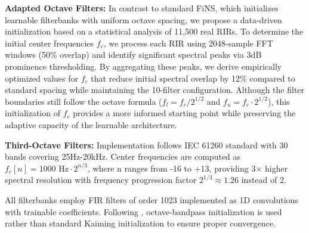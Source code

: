 \documentclass[conference]{IEEEtran}
\begin{document}
\textbf{Adapted Octave Filters:} In contrast to standard FiNS, which initializes learnable filterbanks with uniform octave spacing, we propose a data-driven initialization based on a statistical analysis of 11,500 real RIRs. To determine the initial center frequencies $f_c$, we process each RIR using 2048-sample FFT windows (50\% overlap) and identify significant spectral peaks via 3dB prominence thresholding. By aggregating these peaks, we derive empirically optimized values for $f_c$ that reduce initial spectral overlap by 12\% compared to standard spacing while maintaining the 10-filter configuration. Although the filter boundaries still follow the octave formula ($f_l = f_c/2^{1/2}$ and $f_u = f_c \cdot 2^{1/2}$), this initialization of $f_c$ provides a more informed starting point while preserving the adaptive capacity of the learnable architecture.
 
 
\textbf{Third-Octave Filters:} Implementation follows IEC 61260 \cite{IEC61260-2:2016} standard with 30 bands covering 25Hz-20kHz. Center frequencies are computed as $f_c[n] = 1000 \text{ Hz} \cdot 2^{n/3}$, where n ranges from -16 to +13, providing 3× higher spectral resolution with frequency progression factor $2^{1/3} \approx 1.26$ instead of 2.
 
All filterbanks employ FIR filters of order 1023 implemented as 1D convolutions with trainable coefficients. Following \cite{steinmetz2021filtered}, octave-bandpass initialization is used rather than standard Kaiming initialization to ensure proper convergence.
 
\end{document}

